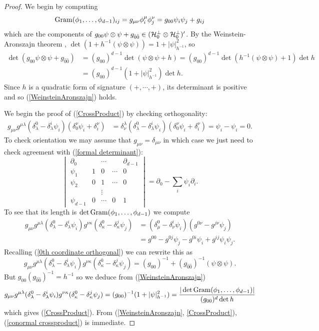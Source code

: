 \begin{proof}
We begin by computing
$$\operatorname{Gram}(\phi_1, \dots, \phi_{d - 1})_{ij} = g_{\mu \nu} \phi_i^\mu \phi_j^\nu = g_{00} \psi_i \psi_j + g_{ij}$$
which are the components of $g_{00}\psi \otimes \psi + g_{\hat 0 \hat 0} \in (\mathcal H_0^\perp \otimes \mathcal H_0^\perp)'$.
By the Weinstein-Aronszajn theorem \cite{Tao13}, $\det(1 + h^{-1}(\psi \otimes \psi)) = 1 + |\psi|_{h^{-1}}^2$, so
\begin{align*}
\det(g_{00}\psi \otimes \psi + g_{\hat 0 \hat 0})
&= (g_{00})^{d - 1} \det(\psi \otimes \psi + h) = (g_{00})^{d - 1} \det(h^{-1}(\psi \otimes \psi) + 1) \det h \\
&= (g_{00})^{d - 1} (1 + |\psi|_{h^{-1}}^2) \det h.
\end{align*}
Since $h$ is a quadratic form of signature $(+, \cdots, +)$, its determinant is positive and so (\ref{WeinsteinAronszajn}) holds.

We begin the proof of (\ref{CrossProduct}) by checking orthogonality:
\begin{align*}
g_{\mu\nu} g^{\mu \lambda} (\delta^0_\lambda - \delta^i_\lambda \psi_i)(\delta^\nu_0 \psi_i + \delta^\nu_i)
&= \delta^\lambda_\nu (\delta^0_\lambda - \delta^i_\lambda \psi_i)(\delta^\nu_0 \psi_i + \delta_i^\nu)
= \psi_i - \psi_i = 0.
\end{align*}
To check orientation we may assume that $g_{\mu\nu} = \delta_{\mu\nu}$ in which case we just need to check agreement with (\ref{formal determinant}):
$$\begin{vmatrix} \partial_0 && \cdots && \partial_{d - 1} \\
\psi_1 & 1 & 0 & \cdots & 0 \\
\psi_2 & 0 & 1 & \cdots & 0\\
&& \vdots \\
\psi_{d - 1} & 0 & \cdots & 0 & 1
\end{vmatrix} = \partial_0 - \sum_i \psi_i \partial_i.$$
To see that its length is $\det \operatorname{Gram}(\phi_1, \dots, \phi_{d - 1})$ we compute
\begin{align*}
g_{\mu \nu} g^{\mu \lambda}(\delta^0_\lambda - \delta^i_\lambda \psi_i) g^{\nu \kappa}(\delta_\kappa^0 - \delta_\kappa^j \psi_j)
&= (\delta_\mu^0 - \delta_\nu^i \psi_i)(g^{0 \nu} - g^{j \nu} \psi_j)\\
&= g^{00} - g^{0j} \psi_j - g^{0i} \psi_i + g^{ij} \psi_i \psi_j.
\end{align*}
Recalling (\ref{0th coordinate orthogonal}) we can rewrite this as
$$g_{\mu \nu} g^{\mu \lambda}(\delta^0_\lambda - \delta^i_\lambda \psi_i) g^{\nu \kappa}(\delta_\kappa^0 - \delta_\kappa^j \psi_j) = (g_{00})^{-1} + (g_{\hat 0 \hat 0})^{-1}(\psi \otimes \psi).$$
But $g_{00} (g_{\hat 0 \hat 0})^{-1} = h^{-1}$ so we deduce from (\ref{WeinsteinAronszajn})
$$g_{\mu \nu} g^{\mu \lambda}(\delta^0_\lambda - \delta^i_\lambda \psi_i) g^{\nu \kappa}(\delta_\kappa^0 - \delta_\kappa^j \psi_j) = (g_{00})^{-1} (1 + |\psi|_{h^{-1}}^2)
= \frac{|\det \operatorname{Gram}(\phi_1, \dots, \phi_{d - 1})|}{(g_{00})^d \det h}$$
which gives (\ref{CrossProduct}).
From (\ref{WeinsteinAronszajn}, \ref{CrossProduct}), (\ref{conormal crossproduct}) is immediate.
\end{proof}

